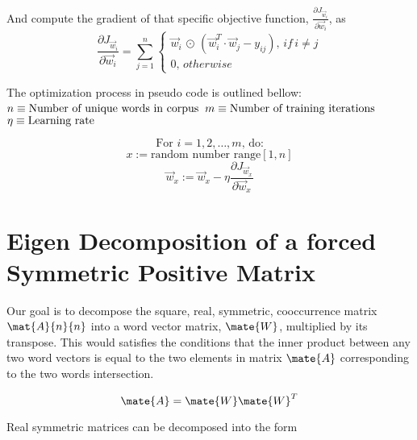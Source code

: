 \documentclass{article}
\begin{document}
And compute the gradient of that specific objective function, $\frac{\partial J_{\vec{w}_{i}}}{\partial \vec{w}_{i}}$, as
\begin{equation*}
\frac{\partial J_{\vec{w}_{i}}}{\partial \vec{w}_{i}} = \sum_{j=1}^{n}{\begin{cases}
\vec{w}_{i} \, \odot \, \left( \vec{w}_{i}^T \cdot \vec{w}_{j} - y_{ij} \right), \, if \, i \neq j
\\
0, \, otherwise
\end{cases}}
\end{equation*}

The optimization process in pseudo code is outlined bellow:
$\\\\ n \equiv \text{Number of unique words in corpus}$
$\\ m \equiv \text{Number of training iterations}$
$\\ \eta \equiv \text{Learning rate}$

\begin{equation*}
\text{For $i = 1,2, \ldots , m$, do:}
\end{equation*}
\begin{equation*}
x := \text{random number range} [1,n]
\end{equation*}
\begin{equation*}
\vec{w}_{x} := \vec{w}_{x} - \eta \frac{\partial J_{\vec{w}_{x}}}{\partial \vec{w}_{x}}
\end{equation*}


%
%

\section{Eigen Decomposition of a forced Symmetric Positive Matrix}
Our goal is to decompose the square, real, symmetric, cooccurrence matrix $\mat{A}{n}{n}$ into a word vector matrix, $\mate{W}$, multiplied by its transpose. This would satisfies the conditions that the inner product between any two word vectors is equal to the two elements in matrix $\mate{A}$ corresponding to the two words intersection.

\begin{equation*}
\mate{A} = \mate{W}\mate{W}^T
\end{equation*}

Real symmetric matrices can be decomposed into the form
\end{document}

